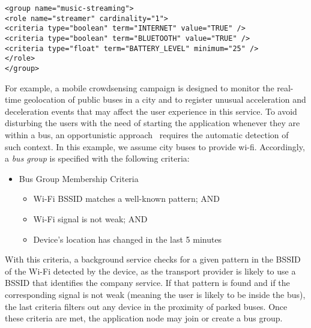 \begin{lstlisting}[caption=Specification of the music streaming group, label=lst:ms_criteria, captionpos=b]
<group name="music-streaming">
<role name="streamer" cardinality="1">
<criteria type="boolean" term="INTERNET" value="TRUE" />
<criteria type="boolean" term="BLUETOOTH" value="TRUE" />
<criteria type="float" term="BATTERY_LEVEL" minimum="25" />
</role>
</group>

\end{lstlisting}


For example, a mobile crowdsensing campaign is designed to monitor the real-time geolocation of public buses in a city and to register unusual acceleration and deceleration events that may affect the user experience in this service. To avoid disturbing the users with the need of starting the application whenever they are within a bus, an opportunistic approach~\cite{} requires the automatic detection of such context. In this example, we assume city buses to provide wi-fi. Accordingly, a \textit{bus group} is specified with the following criteria:

\begin{itemize}
	
	\item Bus Group Membership Criteria
	
	\begin{itemize}
		
		\item Wi-Fi BSSID matches a well-known pattern; AND
		
		\item Wi-Fi signal is not weak; AND
		
		\item Device's location has changed in the last 5 minutes
		
	\end{itemize}
	
\end{itemize}

With this criteria, a background service checks for a given pattern in the BSSID of the Wi-Fi detected by the device, as the transport provider is likely to use a BSSID that identifies the company service. If that pattern is found and if the corresponding signal is not weak (meaning the user is likely to be inside the bus), the last criteria filters out any device in the proximity of parked buses. Once these criteria are met, the application node may join or create a bus group.

